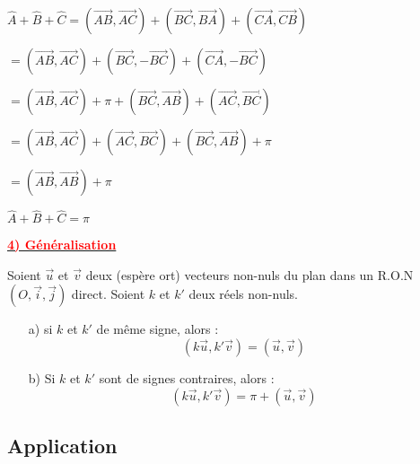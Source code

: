 \documentclass{article}
\begin{document}
\(
\widehat{A} + \widehat{B} + \widehat{C} =
(\overrightarrow{AB}, \overrightarrow{AC}) + (\overrightarrow{BC}, \overrightarrow{BA}) + (\overrightarrow{CA}, \overrightarrow{CB})
\)

\(
= (\overrightarrow{AB}, \overrightarrow{AC}) + (\overrightarrow{BC}, -\overrightarrow{BC}) + (\overrightarrow{CA}, -\overrightarrow{BC})
\)

\(
= (\overrightarrow{AB}, \overrightarrow{AC}) + \pi + (\overrightarrow{BC}, \overrightarrow{AB}) + (\overrightarrow{AC}, \overrightarrow{BC})
\)

\(
= (\overrightarrow{AB}, \overrightarrow{AC}) + (\overrightarrow{AC}, \overrightarrow{BC}) + (\overrightarrow{BC}, \overrightarrow{AB}) + \pi
\)

\(
= (\overrightarrow{AB}, \overrightarrow{AB}) + \pi
\)

\(
\widehat{A} + \widehat{B} + \widehat{C} = \pi
\)

\underline{\textbf{\textcolor{red}{4) Généralisation}}}

Soient $\vec{u}$ et $\vec{v}$ deux (espère ort) vecteurs non-nuls du plan dans un R.O.N $(O,\vec{i},\vec{j})$ direct. Soient $k$ et $k'$ deux réels non-nuls.

\begin{itemize}
    \item[a)] si $k$ et $k'$ de même signe, alors :
    \[ (k \vec{u}, k'\vec{v}) = (\vec{u}, \vec{v}) \]
    \item[b)] Si $k$ et $k'$ sont de signes contraires, alors :
    \[ (k \vec{u},k'\vec{v}) = \pi + \left( \vec{u}, \vec{v} \right) \]
\end{itemize}

\subsection*{Application}
\end{document}
